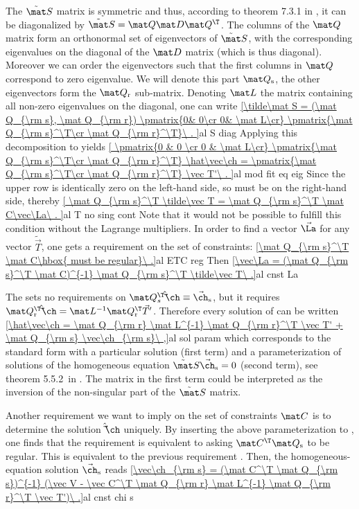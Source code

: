 The $\tilde\mat S$ matrix is symmetric and thus, according to theorem 7.3.1 in , it can be diagonalized by $\tilde\mat S = \mat Q \mat D \mat Q^\T$. The columns of the $\mat Q$ matrix form an orthonormal set of eigenvectors of $\tilde\mat S$, with the corresponding eigenvalues on the diagonal of the $\mat D$ matrix (which is thus diagonal). Moreover we can order the eigenvectors such that the first columns in $\mat Q$ correspond to zero eigenvalue. We will denote this part $\mat Q_{\rm s}$, the other eigenvectors form the $\mat Q_{\rm r}$ sub-matrix. Denoting $\mat L$ the matrix containing all non-zero eigenvalues on the diagonal, one can write
\eqref{\tilde\mat S = (\mat Q_{\rm s}, \mat Q_{\rm r})
	\pmatrix{0& 0\cr 0& \mat L\cr}
	\pmatrix{\mat Q_{\rm s}^\T\cr \mat Q_{\rm r}^\T}\ .
}{al S diag}
Applying this decomposition to  yields
\eqref{
	\pmatrix{0 & 0 \cr 0 & \mat L\cr} \pmatrix{\mat Q_{\rm s}^\T\cr \mat Q_{\rm r}^\T} \hat\vec\ch
	= \pmatrix{\mat Q_{\rm s}^\T\cr \mat Q_{\rm r}^\T} \vec T'\ .
}{al mod fit eq eig}
Since the upper row is identically zero on the left-hand side, so must be on the right-hand side, thereby
\eqref{
	\mat Q_{\rm s}^\T \tilde\vec T = \mat Q_{\rm s}^\T \mat C\vec\La\ .
}{al T no sing cont}
Note that it would not be possible to fulfill this condition without the Lagrange multipliers. In order to find a vector $\vec\La$ for any vector $\tilde\vec T$, one gets a requirement on the set of constraints:
\eqref{\mat Q_{\rm s}^\T \mat C\hbox{ must be regular}\ .}{al ETC reg}
Then
\eqref{\vec\La = (\mat Q_{\rm s}^\T \mat C)^{-1} \mat Q_{\rm s}^\T \tilde\vec T\ .}{al cnst La}

The  sets no requirements on $\mat Q_{s}^\T \hat\vec\ch \equiv \vec\ch_{\rm s}$, but it requires $\mat Q_{\rm r}^\T \hat\vec\ch = \mat L^{-1} \mat Q_{\rm r}^\T \vec T'$. Therefore every solution of  can be written
\eqref{\hat\vec\ch =  \mat Q_{\rm r} \mat L^{-1} \mat Q_{\rm r}^\T \vec T' + \mat Q_{\rm s} \vec\ch_{\rm s}\ ,}{al sol param}
which corresponds to the standard form with a particular solution (first term) and a parameterization of solutions of the homogeneous equation $\tilde\mat S \vec\ch_{\rm s} = 0$ (second term), see theorem 5.5.2~in . The matrix in the first term could be interpreted as the inversion of the non-singular part of the $\tilde\mat S$ matrix.

Another requirement we want to imply on the set of constraints $\mat C$ is to determine the solution $\hat\vec\ch$ uniquely. By inserting the above parameterization to , one finds that the requirement is equivalent to asking $\mat C^\T \mat Q_{\rm s}$ to be regular. This is equivalent to the previous requirement . Then, the homogeneous-equation solution $\vec\ch_{\rm s}$ reads
\eqref{\vec\ch_{\rm s} = (\mat C^\T \mat Q_{\rm s})^{-1} (\vec V - \vec C^\T \mat Q_{\rm r} \mat L^{-1} \mat Q_{\rm r}^\T \vec T')\ .}{al cnst chi s}

